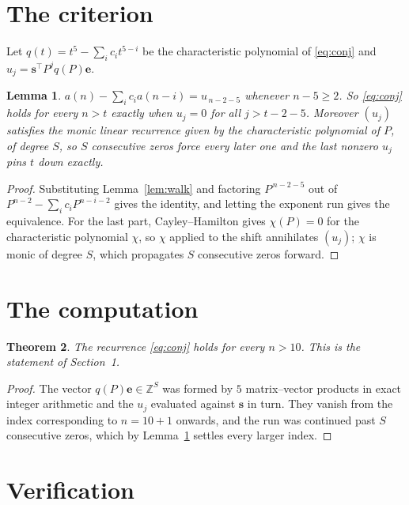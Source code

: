 \documentclass[11pt,a4paper]{article}
\theoremstyle{plain}
\newtheorem{theorem}{Theorem}
\newtheorem{lemma}[theorem]{Lemma}
\theoremstyle{definition}
\begin{document}
\section{The criterion}

Let $q(t)=t^{5}-\sum_i c_i t^{5-i}$ be the characteristic polynomial of
\eqref{eq:conj} and $u_j=\mathbf{s}^{\!\top}P^{j}q(P)\mathbf{e}$.

\begin{lemma}\label{lem:crit}
$a(n)-\sum_i c_i a(n-i)=u_{\,n-2-5}$ whenever $n-5\ge2$. So \eqref{eq:conj}
holds for every $n>t$ exactly when $u_j=0$ for all $j>t-2-5$. Moreover $(u_j)$
satisfies the monic linear recurrence given by the characteristic polynomial of $P$, of
degree $S$, so $S$ consecutive zeros force every later one and the last nonzero $u_j$ pins
$t$ down exactly.
\end{lemma}

\begin{proof}
Substituting Lemma~\ref{lem:walk} and factoring $P^{\,n-2-5}$ out of
$P^{n-2}-\sum_i c_i P^{n-i-2}$ gives the identity, and letting the exponent run gives the
equivalence. For the last part, Cayley--Hamilton gives $\chi(P)=0$ for the characteristic
polynomial $\chi$, so $\chi$ applied to the shift annihilates $(u_j)$; $\chi$ is monic of
degree $S$, which propagates $S$ consecutive zeros forward.
\end{proof}

\section{The computation}

\begin{theorem}
The recurrence \eqref{eq:conj} holds for every $n>10$. This is the statement of
Section~1.
\end{theorem}

\begin{proof}
The vector $q(P)\mathbf{e}\in\mathbb{Z}^{S}$ was formed by $5$ matrix--vector
products in exact integer arithmetic and the $u_j$ evaluated against $\mathbf{s}$ in turn.
They vanish from the index corresponding to $n=10+1$ onwards, and the run was continued
past $S$ consecutive zeros, which by Lemma~\ref{lem:crit} settles every larger index.
\end{proof}

\section{Verification}
\end{document}
